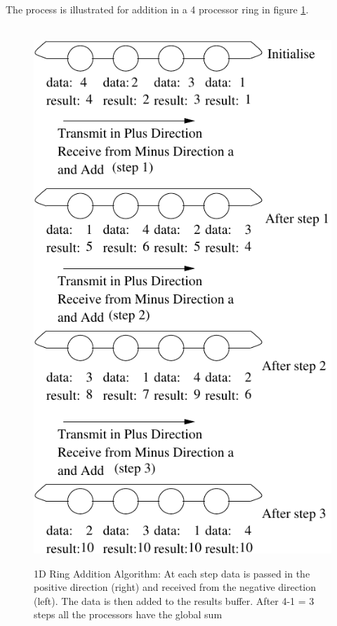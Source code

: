 The process is illustrated for addition in a 4 processor ring in figure
\ref{f:ring_addition}.
\begin{figure}
\begin{center}
\leavevmode
\hbox{%
\includegraphics{1Dring_addition}}
\end{center}
\caption{1D Ring Addition Algorithm: At each step data is passed in 
the positive direction (right) and received from the negative direction (left).
The data is then added to the results buffer. After 4-1 = 3 steps
all the processors have the global sum}
\label{f:ring_addition}
\end{figure}

